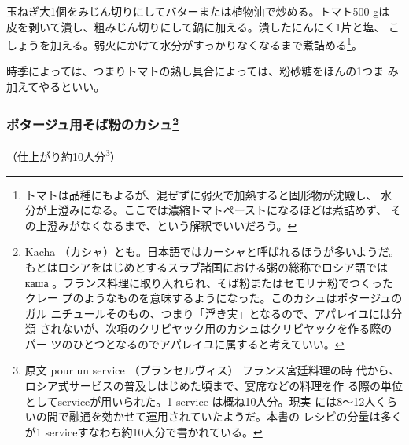 \begin{recette}
玉ねぎ大1個をみじん切りにしてバターまたは植物油で炒める。トマト500 gは
皮を剥いて潰し、粗みじん切りにして鍋に加える。潰したにんにく1片と塩、
こしょうを加える。弱火にかけて水分がすっかりなくなるまで煮詰める\footnote{トマトは品種にもよるが、混ぜずに弱火で加熱すると固形物が沈殿し、
  水分が上澄みになる。ここでは濃縮トマトペーストになるほどは煮詰めず、
  その上澄みがなくなるまで、という解釈でいいだろう。}。

時季によっては、つまりトマトの熟し具合によっては、粉砂糖をほんの1つま
み加えてやるといい。

\maeaki

\hypertarget{kache-de-sarrazin-pour-potage}{%
\subsubsection[ポタージュ用そば粉のカシュ]{\texorpdfstring{ポタージュ用そば粉のカシュ\footnote{Kacha
  （カシャ）とも。日本語ではカーシャと呼ばれるほうが多いようだ。
  もとはロシアをはじめとするスラブ諸国における粥の総称でロシア語では
  каша
  。フランス料理に取り入れられ、そば粉またはセモリナ粉でつくったクレー
  プのようなものを意味するようになった。このカシュはポタージュのガル
  ニチュールそのもの、つまり「浮き実」となるので、アパレイユには分類
  されないが、次項のクリビヤック用のカシュはクリビヤックを作る際のパー
  ツのひとつとなるのでアパレイユに属すると考えていい。}}{ポタージュ用そば粉のカシュ}}\label{kache-de-sarrazin-pour-potage}}



（仕上がり約10人分\footnote{原文 pour un service （プランセルヴィス）
  フランス宮廷料理の時
  代から、ロシア式サービスの普及しはじめた頃まで、宴席などの料理を作
  る際の単位としてserviceが用いられた。1 service は概ね10人分。現実
  には8〜12人くらいの間で融通を効かせて運用されていたようだ。本書の
  レシピの分量は多くが1 serviceすなわち約10人分で書かれている。}）


\end{recette}
